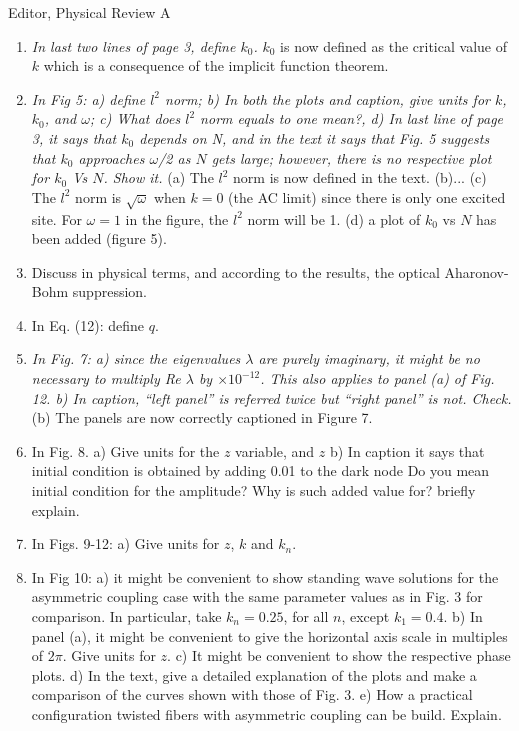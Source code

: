 \documentclass[11pt]{letter}
\begin{document}
\begin{letter}{Editor, Physical Review A}
\begin{enumerate}
\item \emph{In last two lines of page 3, define $k_0$.} $k_0$ is now defined as the critical value of $k$ which is a consequence of the implicit function theorem.

\item \emph{In Fig 5: a) define $l^2$ norm; b) In both the plots and caption, give units for $k$, $k_0$, and $\omega$; c) What does $l^2$ norm equals to one mean?, d) In last line of page 3, it says that $k_0$ depends on N, and in the text it says that Fig. 5 suggests that $k_0$ approaches $\omega$/2 as $N$ gets large; however, there is no respective plot for $k_0$ Vs $N$. Show it.} (a) The $l^2$ norm is now defined in the text. (b)... (c) The $l^2$ norm is $\sqrt{\omega}$ when $k = 0$ (the AC limit) since there is only one excited site. For $\omega = 1$ in the figure, the $l^2$ norm will be 1. (d) a plot of $k_0$ vs $N$ has been added (figure 5).

\item Discuss in physical terms, and according to the results, the optical Aharonov-Bohm suppression.

\item In Eq. (12): define $q$.

\item \emph{In Fig. 7: a) since the eigenvalues $\lambda$ are purely imaginary, it might be no necessary to multiply Re $\lambda$ by $\times10^{-12}$. This also applies to panel (a) of Fig. 12. b) In caption, ``left panel'' is referred twice but ``right panel'' is not. Check.} (b) The panels are now correctly captioned in Figure 7.

\item In Fig. 8. a) Give units for the $z$ variable, and $z$ b) In caption it says that initial condition is obtained by adding 0.01 to the dark node Do you mean initial condition for the amplitude? Why is such added value for? briefly explain.

\item In Figs. 9-12: a) Give units for $z$, $k$ and $k_n$.

\item In Fig 10: a) it might be convenient to show standing wave solutions for the asymmetric coupling case with the same parameter values as in Fig. 3 for comparison. In particular, take $k_n=0.25$, for all $n$, except $k_1=0.4$. b) In panel (a), it might be convenient to give the horizontal axis scale in multiples of $2\pi$. Give units for $z$. c) It might be convenient to show the respective phase plots. d) In the text, give a detailed explanation of the plots and make a comparison of the curves shown with those of Fig. 3. e) How a practical configuration twisted fibers with asymmetric coupling can be build. Explain.


\end{enumerate}
\end{letter}
\end{document}
